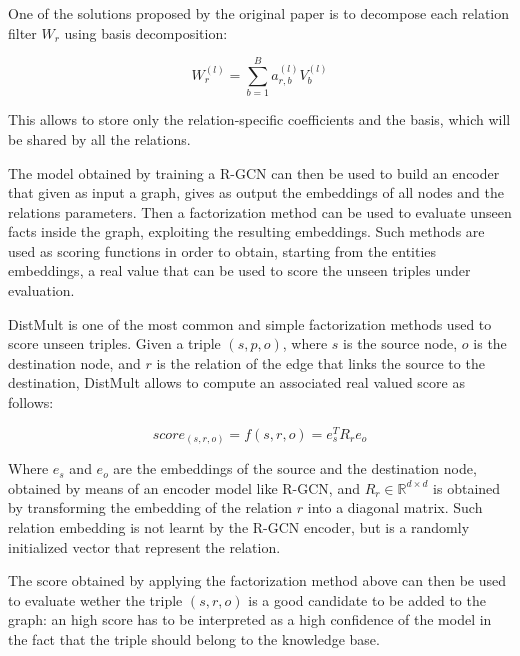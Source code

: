 \documentclass[%
    corpo=13.5pt,
    twoside,
    oldstyle,
    tipotesi=magistrale,
    greek,
    evenboxes
]{toptesi}
\begin{document}
One of the solutions proposed by the original
paper \cite{schlichtkrull2018} is to decompose each relation filter $W_r$
using basis decomposition:

\begin{equation}
    W_r^{(l)} = \sum_{b=1}^B a_{r,b}^{(l)} V_b^{(l)}
\end{equation}

This allows to store only the relation-specific coefficients and the basis,
which will be shared by all the relations.

The model obtained by training a R-GCN can then be used to build an encoder
that given as input a graph, gives as output the embeddings of all nodes and
the relations parameters. Then a factorization method can be used to
evaluate unseen facts inside the graph, exploiting the resulting embeddings.
Such methods are used as scoring functions in order to obtain, starting from
the entities embeddings, a real value that can be used to score the unseen
triples under evaluation.
\newline

DistMult \cite{yang2014} is one of the most common and simple factorization
methods used to score unseen triples. Given a triple $(s, p, o)$, where $s$
is the source node, $o$ is the destination node, and $r$ is the relation of the
edge that links the source to the destination, DistMult allows to compute
an associated real valued score as follows:

\begin{equation}
    score_{(s,r,o)} = f(s,r,o) = e_s^T R_r e_o
\end{equation}

Where $e_s$ and $e_o$ are the embeddings of the source and the destination node,
obtained by means of an encoder model like R-GCN, and
$R_r\in\mathbb{R}^{d \times d}$ is obtained by transforming the embedding
of the relation $r$ into a diagonal matrix. Such relation embedding is not
learnt by the R-GCN encoder, but is a randomly initialized vector that
represent the relation.

The score obtained by applying the factorization method above can then be used
to evaluate wether the triple $(s,r,o)$ is a good candidate to be added to the
graph: an high score has to be interpreted as a high confidence of the model
in the fact that the triple should belong to the knowledge base.



\end{document}
